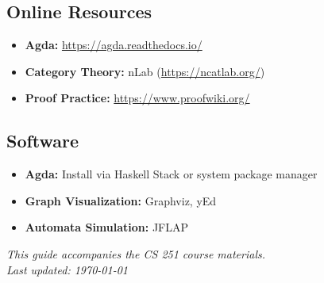 \documentclass[11pt]{article}
\begin{document}
\subsection{Online Resources}
\begin{itemize}
    \item \textbf{Agda:} \url{https://agda.readthedocs.io/}
    \item \textbf{Category Theory:} nLab (\url{https://ncatlab.org/})
    \item \textbf{Proof Practice:} \url{https://www.proofwiki.org/}
\end{itemize}

\subsection{Software}
\begin{itemize}
    \item \textbf{Agda:} Install via Haskell Stack or system package manager
    \item \textbf{Graph Visualization:} Graphviz, yEd
    \item \textbf{Automata Simulation:} JFLAP
\end{itemize}

\vfill
\begin{center}
\textit{This guide accompanies the CS 251 course materials.}\\
\textit{Last updated: \today}
\end{center}
\end{document}
